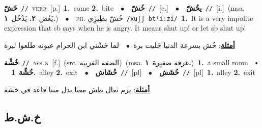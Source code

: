 \documentclass[10pt,a4paper,twoside]{article} %
\begin{document}
\begin{multicols}{2}
{\setlength\topsep{0pt}\textbf{\foreignlanguage{arabic}{خَشّ}}\ {\color{gray}\texttt{//}\color{black}}\ \textsc{verb}\ [p.]\ \textbf{1.}~come  \textbf{2.}~bite\ \ $\bullet$\ \ \setlength\topsep{0pt}\textbf{\foreignlanguage{arabic}{خُشّ}}\ {\color{gray}\texttt{//}\color{black}}\ [c.]\ \ $\bullet$\ \ \setlength\topsep{0pt}\textbf{\foreignlanguage{arabic}{يخُشّ}}\ {\color{gray}\texttt{//}\color{black}}\ [i.]\ \color{gray}(msa. \foreignlanguage{arabic}{يَعُض}~\foreignlanguage{arabic}{\textbf{٢.}}  \foreignlanguage{arabic}{يَدْخُل}~\foreignlanguage{arabic}{\textbf{١.}})\color{black}\ \ $\bullet$\ \ \textsc{ph.} \color{gray} \foreignlanguage{arabic}{خُشّ بطِيزِي}\color{black}\ {\color{gray}\texttt{/{\sffamily xuʃʃ btˤiːzi}/}\color{black}}\ \textbf{1.}~It is a very impolite expression that sb says when he is angry. It means shut up! or let sb shut up!\  \begin{flushright}\color{gray}\foreignlanguage{arabic}{\textbf{\underline{\foreignlanguage{arabic}{أمثلة}}}: خُش بسرعة الدنيا حَليت برة\ $\bullet$\ \  لما خَشْني ابن الحرام عيونه طلعوا لبرة}\end{flushright}\color{black}} \vspace{2mm}

{\setlength\topsep{0pt}\textbf{\foreignlanguage{arabic}{خُشِّة}}\ {\color{gray}\texttt{//}\color{black}}\ \textsc{noun}\ [f.]\ (src. \color{gray}\foreignlanguage{arabic}{الضفة الغربية}\color{black})\ \color{gray}(msa. \foreignlanguage{arabic}{غرفة صغيرة}~\foreignlanguage{arabic}{\textbf{١.}})\color{black}\ \textbf{1.}~a small room\ \ $\smblkdiamond$\ \ \setlength\topsep{0pt}\textbf{\foreignlanguage{arabic}{خُشِّة}}\ \textbf{1.}~alley  \textbf{2.}~exit\ \ $\bullet$\ \ \setlength\topsep{0pt}\textbf{\foreignlanguage{arabic}{خْشَاش}}\ {\color{gray}\texttt{//}\color{black}}\ [pl]\ \ $\bullet$\ \ \setlength\topsep{0pt}\textbf{\foreignlanguage{arabic}{خُشَش}}\ {\color{gray}\texttt{//}\color{black}}\ [pl]\ \textbf{1.}~alley  \textbf{2.}~exit\  \begin{flushright}\color{gray}\foreignlanguage{arabic}{\textbf{\underline{\foreignlanguage{arabic}{أمثلة}}}: يزم تعال طش معنا بدل منتا قاعد في خشة}\end{flushright}\color{black}} \vspace{2mm}

\vspace{-3mm}
\subsection*{\color{blue}\foreignlanguage{arabic}{خ.ش.ط}\color{blue}{}} 


\end{multicols}
\end{document}
